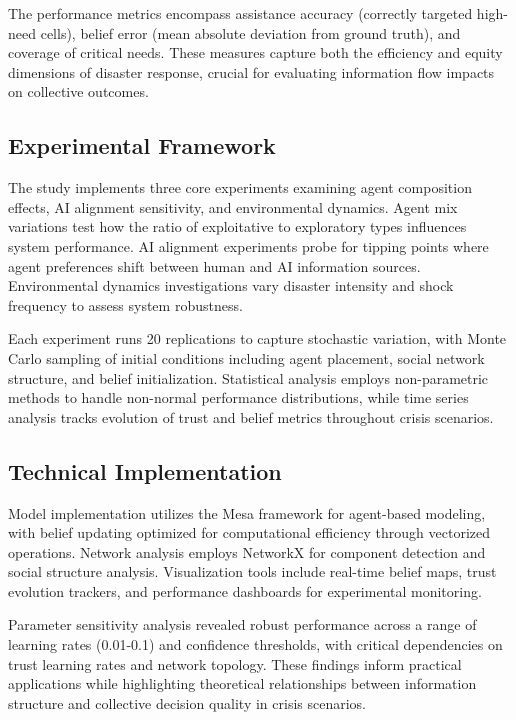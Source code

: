 \documentclass[pdflatex,sn-apa]{sn-jnl}%
\begin{document}
The performance metrics encompass assistance accuracy (correctly targeted high-need cells), belief error (mean absolute deviation from ground truth), and coverage of critical needs. These measures capture both the efficiency and equity dimensions of disaster response, crucial for evaluating information flow impacts on collective outcomes.

\subsection{Experimental Framework}

The study implements three core experiments examining agent composition effects, AI alignment sensitivity, and environmental dynamics. Agent mix variations test how the ratio of exploitative to exploratory types influences system performance. AI alignment experiments probe for tipping points where agent preferences shift between human and AI information sources. Environmental dynamics investigations vary disaster intensity and shock frequency to assess system robustness.

Each experiment runs 20 replications to capture stochastic variation, with Monte Carlo sampling of initial conditions including agent placement, social network structure, and belief initialization. Statistical analysis employs non-parametric methods to handle non-normal performance distributions, while time series analysis tracks evolution of trust and belief metrics throughout crisis scenarios.

\subsection{Technical Implementation}

Model implementation utilizes the Mesa framework for agent-based modeling, with belief updating optimized for computational efficiency through vectorized operations. Network analysis employs NetworkX for component detection and social structure analysis. Visualization tools include real-time belief maps, trust evolution trackers, and performance dashboards for experimental monitoring.

Parameter sensitivity analysis revealed robust performance across a range of learning rates (0.01-0.1) and confidence thresholds, with critical dependencies on trust learning rates and network topology. These findings inform practical applications while highlighting theoretical relationships between information structure and collective decision quality in crisis scenarios.
\end{document}
